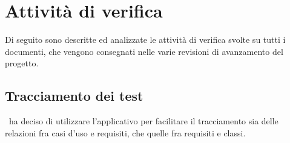 \documentclass[../PianoDiQualifica_v3.0.0.tex]{subfiles}
\begin{document}
\appendix
\section{Attività di verifica}\label{sec:verifica}
Di seguito sono descritte ed analizzate le attività di verifica svolte su tutti i documenti, che vengono consegnati nelle varie revisioni di avanzamento del progetto.

\subsection{Tracciamento dei test}

	\kpanic\ ha deciso di utilizzare l'applicativo  per facilitare il tracciamento sia delle relazioni fra casi d'uso e requisiti, che quelle fra requisiti e classi.

\end{document}
